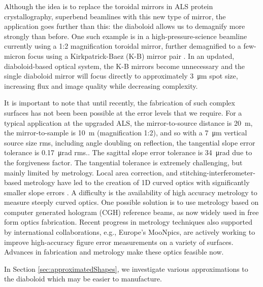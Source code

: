 \documentclass[preprint]{iucr}       %
\newcommand{\inred}[1]{{\color{red}#1}}
\begin{document}
Although the idea is to replace the toroidal mirrors in ALS protein crystallography, superbend beamlines with this new type of mirror, the application goes further than this: the diaboloid allows us to demagnify more strongly than before. One such example is in a high-pressure-science beamline currently using a 1:2 magnification toroidal mirror, further demagnified to a few-micron focus using a Kirkpatrick-Baez (K-B) mirror pair \cite{Kirkpatrick1946}. In an updated, diaboloid-based optical system, the K-B mirrors become unnecessary and the single diaboloid mirror will focus directly to approximately \SI{3}{\micro\meter} spot size, increasing flux and image quality while decreasing complexity.

It is important to note that until recently, the fabrication of such complex surfaces has not been been possible at the error levels that we require. For a typical application at the \inred{upgraded} ALS, the mirror-to-source distance is \SI{20}{\meter}\inred{, the mirror-to-sample is \SI{10}{\meter} (magnification 1:2)}, and so with a \SI{7}{\micro\meter} vertical source size \inred{rms}, including angle doubling on reflection, the tangential slope error tolerance is \SI{0.17}{\micro\radian} \inred{rms.}. The sagittal slope error tolerance is \SI{34}{\micro\radian} \inred{due to the forgiveness factor}. The tangential tolerance is extremely challenging, but mainly limited by metrology. Local area correction, and stitching-interferometer-based metrology have led to the creation of 1D curved optics with significantly smaller slope errors \cite{Yamauchi2002}. 
A difficulty is the availability of high accuracy metrology to measure steeply curved optics. One possible solution is to use metrology based on computer generated hologram (CGH) \inred{\cite{Wyant, Poleshchuk}} reference beams, as now widely used in free form optics fabrication. 
\inred{Recent progress in metrology techniques \cite{diamond2019} also supported by international collaborations, e.g.,  Europe’s MooNpics, are actively working to improve high-accuracy figure error measurements on a variety of surfaces. 
}
Advances in fabrication and metrology make these optics feasible now.


In Section \ref{sec:approximatedShapes}, we investigate various approximations to the diaboloid which may be easier to manufacture.
\end{document}
